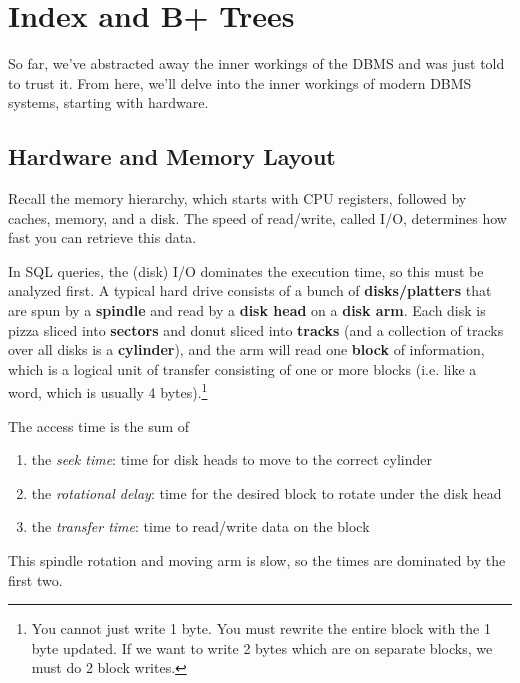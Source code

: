 \section{Index and B+ Trees} 

  So far, we've abstracted away the inner workings of the DBMS and was just told to trust it. From here, we'll delve into the inner workings of modern DBMS systems, starting with hardware.   

\subsection{Hardware and Memory Layout}

  Recall the memory hierarchy, which starts with CPU registers, followed by caches, memory, and a disk. The speed of read/write, called I/O, determines how fast you can retrieve this data. 

  \begin{definition}
    \label{def:hard-disk}
    In SQL queries, the (disk) I/O dominates the execution time, so this must be analyzed first. A typical hard drive consists of a bunch of \textbf{disks/platters} that are spun by a \textbf{spindle} and read by a \textbf{disk head} on a \textbf{disk arm}. Each disk is pizza sliced into \textbf{sectors} and donut sliced into \textbf{tracks} (and a collection of tracks over all disks is a \textbf{cylinder}), and the arm will read one \textbf{block} of information, which is a logical unit of transfer consisting of one or more blocks (i.e. like a word, which is usually 4 bytes).\footnote{You cannot just write 1 byte. You must rewrite the entire block with the 1 byte updated. If we want to write 2 bytes which are on separate blocks, we must do 2 block writes.} 
  \end{definition}

  \begin{definition}
    \label{def:access-time}
    The access time is the sum of 
    \begin{enumerate}
      \item the \textit{seek time}: time for disk heads to move to the correct cylinder 
      \item the \textit{rotational delay}: time for the desired block to rotate under the disk head 
      \item the \textit{transfer time}: time to read/write data on the block
    \end{enumerate}
    This spindle rotation and moving arm is slow, so the times are dominated by the first two. 
  \end{definition}

